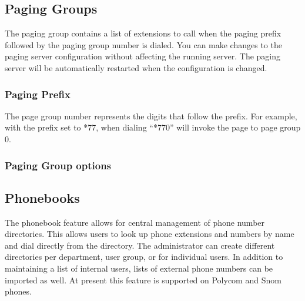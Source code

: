 \documentclass[letterpaper,10pt,english]{sphinxmanual}
\begin{document}
\subsection{Paging Groups}
\label{\detokenize{webui:paging-groups}}\label{\detokenize{webui:id16}}
The paging group contains a list of extensions to call when the paging prefix followed by the paging group number is dialed.
You can make changes to the paging server configuration without affecting the running server.
The paging server will be automatically restarted when the configuration is changed.
\begin{quote}

\end{quote}


\subsubsection{Paging Prefix}
\label{\detokenize{webui:paging-prefix}}
The page group number represents the digits that follow the prefix. For example, with the prefix set to *77, when dialing “*770” will invoke the page to page group 0.
\begin{quote}

\end{quote}


\subsubsection{Paging Group options}
\label{\detokenize{webui:paging-group-options}}\begin{quote}

\end{quote}


\subsection{Phonebooks}
\label{\detokenize{webui:phonebooks}}\label{\detokenize{webui:id17}}
The phonebook feature allows for central management of phone number directories. This allows users to look up phone extensions and numbers by name and dial directly from the directory. The administrator can create different directories per department, user group, or for individual users. In addition to maintaining a list of internal users, lists of external phone numbers can be imported as well. At present this feature is supported on Polycom and Snom phones.
\begin{quote}

\end{quote}
\end{document}
